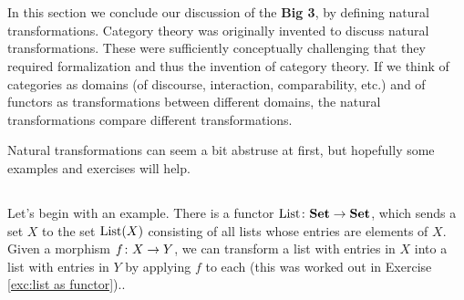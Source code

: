 \documentclass[CT4S-EN-RU]{subfiles}
\begin{document}
\section{}\label{sec:nat trans}

\begin{blockENG}
In this section we conclude our discussion of the {\bf Big 3}, by defining natural transformations. Category theory was originally invented to discuss natural transformations. These were sufficiently conceptually challenging that they required formalization and thus the invention of category theory. If we think of categories as domains (of discourse, interaction, comparability, etc.) and of functors as transformations between different domains, the natural transformations compare different transformations.
\end{blockENG}

\begin{blockRUS}
\end{blockRUS}

\begin{blockENG}
Natural transformations can seem a bit abstruse at first, but hopefully some examples and exercises will help.
\end{blockENG}

\begin{blockRUS}
\end{blockRUS}


\subsection{}

\begin{blockENG}
Let's begin with an example. There is a functor $\textnormal{List}\colon{\bf Set}\rightarrow{\bf Set}$, which sends a set $X$ to the set $\textnormal{List}(X)$ consisting of all lists whose entries are elements of $X$. Given a morphism $f\colon X\rightarrow Y$, we can transform a list with entries in $X$ into a list with entries in $Y$ by applying $f$ to each (this was worked out in Exercise \ref{exc:list as functor}).. 
\end{blockENG}

\begin{blockRUS}
\end{blockRUS}
\end{document}
